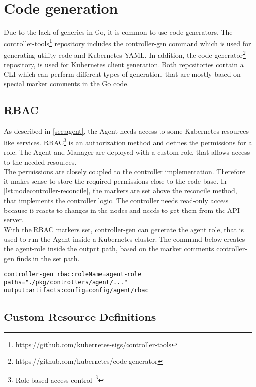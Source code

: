 \section{Code generation}\label{sec:code-generator}

Due to the lack of generics in Go, it is common to use code generators.
The controller-tools\footnote{https://github.com/kubernetes-sigs/controller-tools} repository includes the controller-gen command which is used for generating utility code and Kubernetes YAML.
In addition, the code-generator\footnote{https://github.com/kubernetes/code-generator} repository, is used for Kubernetes client generation.
Both repositories contain a CLI which can perform different types of generation, that are mostly based on special marker comments in the Go code.

\subsection{RBAC}

As described in \autoref{sec:agent}, the Agent needs access to some Kubernetes resources like services.
RBAC\footnote{Role-based access control~\footcite{RBAC}} is an authorization method and defines the permissions for a role.
The Agent and Manager are deployed with a custom role, that allows access to the needed resources.
\\
The permissions are closely coupled to the controller implementation.
Therefore it makes sense to store the required permissions close to the code base.
In \autoref{lst:nodecontroller-reconcile}, the markers are set above the reconcile method, that implements the controller logic.
The controller needs read-only access because it reacts to changes in the nodes and needs to get them from the API server.
\\
With the RBAC markers set, controller-gen can generate the agent role, that is used to run the Agent inside a Kubernetes cluster.
The command below creates the agent-role inside the output path, based on the marker comments controller-gen finds in the set path.
\\
\begin{lstlisting}[numbers=none, caption={Generate Role YAML files with controller-gen}, label={lst:role-generation}]
controller-gen rbac:roleName=agent-role paths="./pkg/controllers/agent/..." output:artifacts:config=config/agent/rbac
\end{lstlisting}

\subsection{Custom Resource Definitions}

